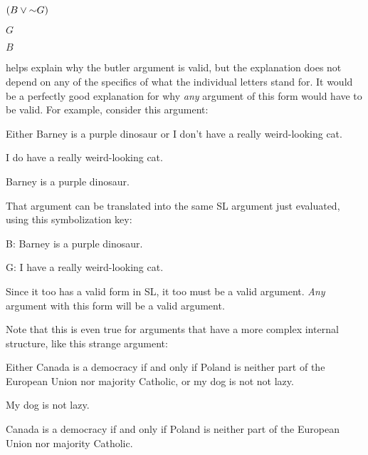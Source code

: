 \begin{earg}
\item $(B\eor\enot G)$
\item $G$
\item[\therefore] $B$
\end{earg}

helps explain why the butler argument is valid, but the explanation does not depend on any of the specifics of what the individual letters stand for. It would be a perfectly good explanation for why \emph{any} argument of this form would have to be valid. For example, consider this argument:

\begin{earg}
\item Either Barney is a purple dinosaur or I don't have a really weird-looking cat.
\item I do have a really weird-looking cat.
\item[\therefore] Barney is a purple dinosaur.
\end{earg}

That argument can be translated into the same SL argument just evaluated, using this symbolization key:

\begin{ekey}
\item[B:] Barney is a purple dinosaur.
\item[G:] I have a really weird-looking cat.
\end{ekey}

Since it too has a valid form in SL, it too must be a valid argument. \emph{Any} argument with this form will be a valid argument.


Note that this is even true for arguments that have a more complex internal structure, like this strange argument:

\begin{earg}
\item Either Canada is a democracy if and only if Poland is neither part of the European Union nor majority Catholic, or my dog is not not lazy.
\item My dog is not lazy.
\item[\therefore] Canada is a democracy if and only if Poland is neither part of the European Union nor majority Catholic.
\end{earg}

